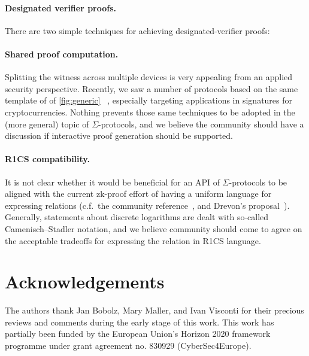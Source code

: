 \documentclass[runningheads]{llncs}
\newif\ifanonymous
\begin{document}
\paragraph{Designated verifier proofs.} There are two simple techniques for achieving designated-verifier proofs:

\paragraph{Shared proof computation.} Splitting the witness across multiple devices is very appealing from an applied security perspective.
Recently, we saw a number of protocols based on the same template of of \cref{fig:generic} ~\cite{EPRINT:KomGol20,EPRINT:NicRufSeu20}, especially targeting applications in signatures for cryptocurrencies.
Nothing prevents those same techniques to be adopted in the (more general) topic of $\Sigma$-protocols, and we believe the community should have a discussion if interactive proof generation should be supported.
\paragraph{R1CS compatibility.} It is not clear whether it would be beneficial for an API of $\Sigma$-protocols to be aligned with the current zk-proof effort of having a uniform
language for expressing relations (c.f.\ the community reference~\cite[section 3]{zkproof-reference}, and Drevon's proposal~\cite{jr1cs}).
Generally, statements about discrete logarithms are dealt with so-called Camenisch--Stadler notation, and we believe community should come to agree on the acceptable tradeoffs for expressing the relation in R1CS language.

\ifanonymous\else
\section*{Acknowledgements}
The authors thank Jan Bobolz, Mary Maller, and Ivan Visconti for their precious reviews and comments during the early stage of this work.
This work has partially been funded by the European Union's Horizon 2020 framework programme under grant agreement no. 830929 (CyberSec4Europe).
\fi


%
\end{document}
